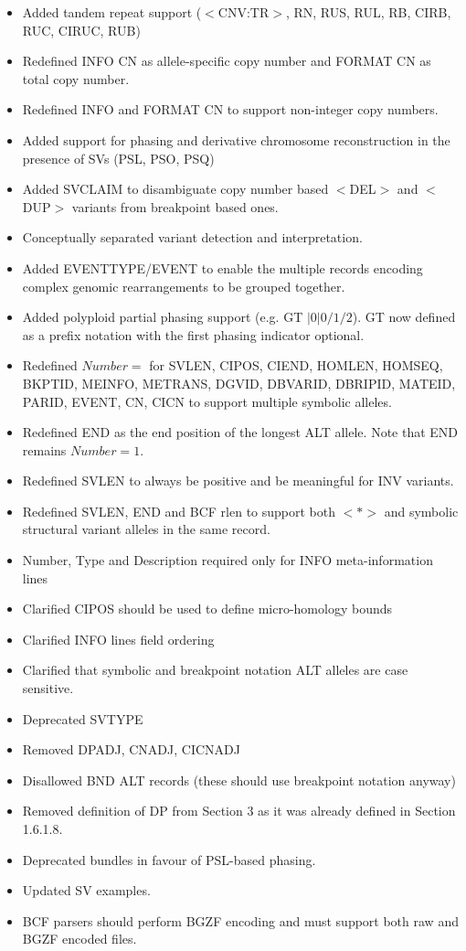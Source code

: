 \documentclass[8pt]{article}
\begin{document}
\begin{itemize}
\item Added tandem repeat support ($<$CNV:TR$>$, RN, RUS, RUL, RB, CIRB, RUC, CIRUC, RUB)
\item Redefined INFO CN as allele-specific copy number and FORMAT CN as total copy number.
\item Redefined INFO and FORMAT CN to support non-integer copy numbers.
\item Added support for phasing and derivative chromosome reconstruction in the presence of SVs (PSL, PSO, PSQ)
\item Added SVCLAIM to disambiguate copy number based $<$DEL$>$ and $<$DUP$>$ variants from breakpoint based ones.
\item Conceptually separated variant detection and interpretation.
\item Added EVENTTYPE/EVENT to enable the multiple records encoding complex genomic rearrangements to be grouped together.
\item Added polyploid partial phasing support (e.g. GT $|0|0/1/2$). GT now defined as a prefix notation with the first phasing indicator optional.
\item Redefined $Number=$ for SVLEN, CIPOS, CIEND, HOMLEN, HOMSEQ, BKPTID, MEINFO, METRANS, DGVID, DBVARID, DBRIPID, MATEID, PARID, EVENT, CN, CICN to support multiple symbolic alleles.
\item Redefined END as the end position of the longest ALT allele. Note that END remains $Number=1$.
\item Redefined SVLEN to always be positive and be meaningful for INV variants.
\item Redefined SVLEN, END and BCF rlen to support both $<*>$ and symbolic structural variant alleles in the same record.
\item Number, Type and Description required only for INFO meta-information lines
\item Clarified CIPOS should be used to define micro-homology bounds
\item Clarified INFO lines field ordering
\item Clarified that symbolic and breakpoint notation ALT alleles are case sensitive.
\item Deprecated SVTYPE
\item Removed DPADJ, CNADJ, CICNADJ
\item Disallowed BND ALT records (these should use breakpoint notation anyway)
\item Removed definition of DP from Section 3 as it was already defined in Section 1.6.1.8.
\item Deprecated bundles in favour of PSL-based phasing.
\item Updated SV examples.
\item BCF parsers should perform BGZF encoding and must support both raw and BGZF encoded files.
\end{itemize}
\end{document}
